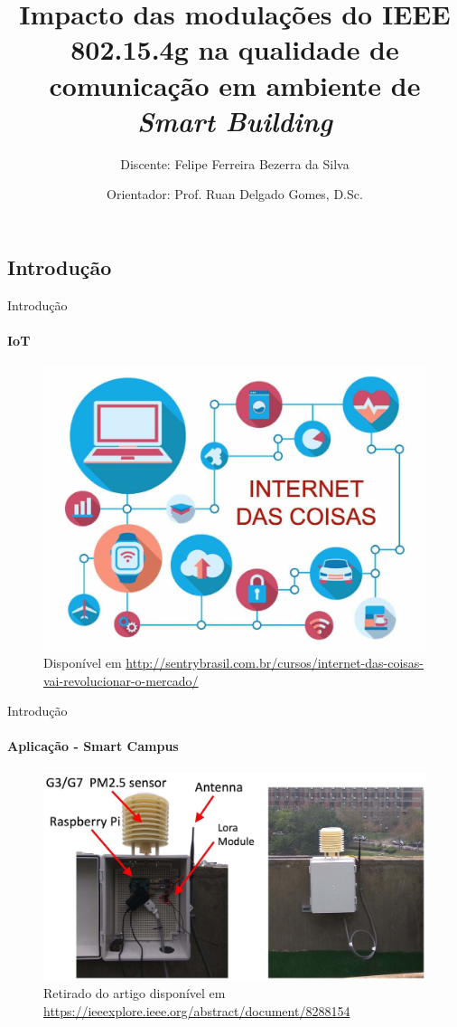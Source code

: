 \documentclass[c]{beamer}
\title{Impacto das modulações do {IEEE 802.15.4g} na qualidade de comunicação em ambiente de \textit{Smart Building}}
\subtitle{Discente: Felipe Ferreira Bezerra da Silva}
\author{Orientador: Prof. Ruan Delgado Gomes, D.Sc.}
\begin{document}
\frame[c]{\maketitle}


\begin{darkframes}

  \section{Introdução}
  \begin{frame}{Introdução}
    \framesubtitle{IoT}
    \begin{figure}[ht]
      \centering
      \includegraphics[width=.7\textwidth]{resources/intro_iot.jpg}\\
      \footnotesize{Disponível em  \url{http://sentrybrasil.com.br/cursos/internet-das-coisas-vai-revolucionar-o-mercado/}}
    \end{figure}
  \end{frame}

  \begin{frame}{Introdução}
    \framesubtitle{Aplicação - Smart Campus}
    \begin{figure}[ht]
      \centering
      \includegraphics[width=.9\textwidth]{resources/smart-campus-example.png}\\
      \footnotesize{Retirado do artigo disponível em \url{https://ieeexplore.ieee.org/abstract/document/8288154}}
    \end{figure}
  \end{frame}


\end{darkframes}
\end{document}
